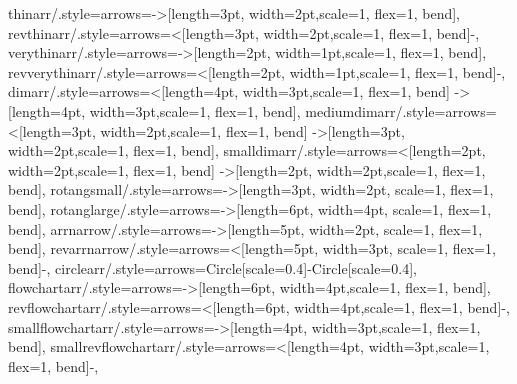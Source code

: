 {%
thinarr/.style={arrows={->[length=3pt, width=2pt,scale=1, flex=1, bend]}},
revthinarr/.style={arrows={<[length=3pt, width=2pt,scale=1, flex=1, bend]-}},
%
verythinarr/.style={arrows={->[length=2pt, width=1pt,scale=1, flex=1, bend]}},
revverythinarr/.style={arrows={<[length=2pt, width=1pt,scale=1, flex=1, bend]-}},
%
dimarr/.style={arrows={<[length=4pt, width=3pt,scale=1, flex=1, bend]
->[length=4pt, width=3pt,scale=1, flex=1, bend]}},
mediumdimarr/.style={arrows={<[length=3pt, width=2pt,scale=1, flex=1, bend]
->[length=3pt, width=2pt,scale=1, flex=1, bend]}},
smalldimarr/.style={arrows={<[length=2pt, width=2pt,scale=1, flex=1, bend]
->[length=2pt, width=2pt,scale=1, flex=1, bend]}},
%
rotangsmall/.style={arrows={->[length=3pt, width=2pt, scale=1, flex=1, bend]}},
rotanglarge/.style={arrows={->[length=6pt, width=4pt, scale=1, flex=1, bend]}},
%
arrnarrow/.style={arrows={->[length=5pt, width=2pt, scale=1, flex=1, bend]}},
revarrnarrow/.style={arrows={<[length=5pt, width=3pt, scale=1, flex=1, bend]-}},
%
circlearr/.style={arrows={Circle[scale=0.4]-Circle[scale=0.4]}},
%
%
flowchartarr/.style={arrows={->[length=6pt, width=4pt,scale=1, flex=1, bend]}},
revflowchartarr/.style={arrows={<[length=6pt, width=4pt,scale=1, flex=1, bend]-}},
smallflowchartarr/.style={arrows={->[length=4pt, width=3pt,scale=1, flex=1, bend]}},
smallrevflowchartarr/.style={arrows={<[length=4pt, width=3pt,scale=1, flex=1, bend]-}},
}